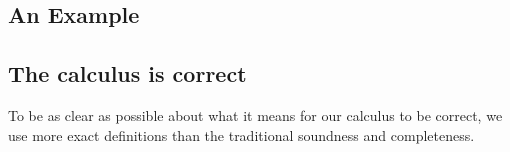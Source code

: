 \documentclass{easychair}
\theoremstyle{definition}
\begin{document}




\subsection{An Example}

\subsection{The calculus is correct}

To be as clear as possible about what it means for our calculus to be correct,
we use more exact definitions than the traditional soundness and completeness.
\end{document}
